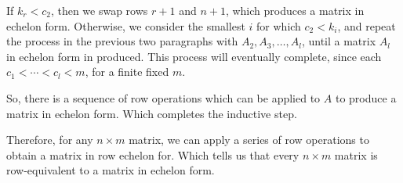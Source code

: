 \documentclass[12pt]{article}
\begin{document}
If $k_r<c_2$, then we swap rows $r+1$ and $n+1$, which produces a matrix in echelon form. Otherwise, we consider the smallest $i$ for which $c_2<k_i$, and repeat the process in the previous two paragraphs with $A_2,A_3,\dots,A_l$, until a matrix $A_l$ in echelon form in produced. This process will eventually complete, since each $c_1<\cdots<c_l<m$, for a finite fixed $m$.

So, there is a sequence of row operations which can be applied to $A$ to produce a matrix in echelon form. Which completes the inductive step.

Therefore, for any $n\times m$ matrix, we can apply a series of row operations to obtain a matrix in row echelon for. Which tells us that every $n\times m$ matrix is row-equivalent to a matrix in echelon form.
\end{document}
